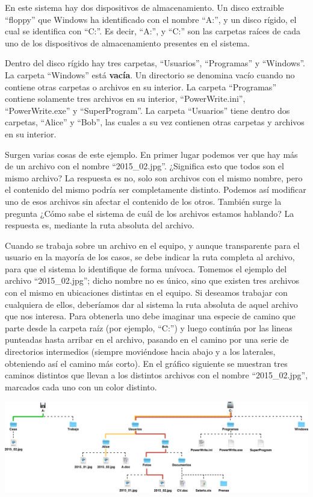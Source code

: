 En este sistema hay dos dispositivos de almacenamiento. Un disco extraible
``floppy'' que Windows ha identificado con el nombre ``A:'', y un disco rígido,
el cual se identifica con ``C:''. Es decir, ``A:'', y ``C:'' son las carpetas
raíces de cada uno de los dispositivos de almacenamiento presentes en el
sistema.

Dentro del disco rígido hay tres carpetas, ``Usuarios'', ``Programas'' y
``Windows''. La carpeta ``Windows'' está \textbf{vacía}. Un directorio se
denomina vacío cuando no contiene otras carpetas o archivos en su interior. La
carpeta ``Programas'' contiene solamente tres archivos en su interior,
``PowerWrite.ini'', ``PowerWrite.exe'' y ``SuperProgram''. La carpeta
``Usuarios'' tiene dentro dos carpetas, ``Alice'' y ``Bob'', las cuales a su vez
contienen otras carpetas y archivos en su interior.

Surgen varias cosas de este ejemplo. En primer lugar podemos ver que hay más de
un archivo con el nombre ``2015\_02.jpg''. ¿Significa esto que todos son el
mismo archivo? La respuesta es no, solo son archivos con el mismo nombre, pero
el contenido del mismo podría ser completamente distinto. Podemos así modificar
uno de esos archivos sin afectar el contenido de los otros. También surge la
pregunta ¿Cómo sabe el sistema de cuál de los archivos estamos hablando? La
respuesta es, mediante la ruta absoluta del archivo.

Cuando se trabaja sobre un archivo en el equipo, y aunque transparente para el
usuario en la mayoría de los casos, se debe indicar la ruta completa al archivo,
para que el sistema lo identifique de forma unívoca. Tomemos el ejemplo del
archivo ``2015\_02.jpg''; dicho nombre no es único, sino que existen tres
archivos con el mismo en ubicaciones distintas en el equipo. Si deseamos
trabajar con cualquiera de ellos, deberíamos dar al sistema la ruta absoluta de
aquel archivo que nos interesa. Para obtenerla uno debe imaginar una especie de
camino que parte desde la carpeta raíz (por ejemplo, ``C:'') y luego continúa
por las lineas punteadas hasta arribar en el archivo, pasando en el camino por
una serie de directorios intermedios (siempre moviéndose hacia abajo y a los
laterales, obteniendo así el camino más corto). En el gráfico siguiente se
muestran tres caminos distintos que llevan a los distintos archivos con el
nombre ``2015\_02.jpg'', marcados cada uno con un color distinto.

\vspace{0.5cm}
\centerline{\includegraphics[scale=0.35]{unidades/2_informacion/2_informatica/imagenes/directorios_windows_2.png}}

